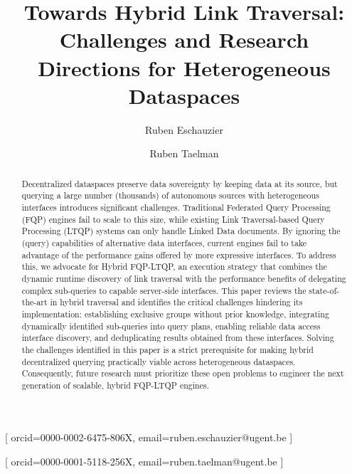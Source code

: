 \documentclass{ceurart}
\theoremstyle{definition}
\begin{document}


\title{Towards Hybrid Link Traversal: Challenges and Research Directions for Heterogeneous Dataspaces}

\author[1]{Ruben Eschauzier}[%
orcid=0000-0002-6475-806X,
email=ruben.eschauzier@ugent.be
]
\author[1]{Ruben Taelman}[%
orcid=0000-0001-5118-256X,
email=ruben.taelman@ugent.be
]

\address[1]{Department of Electronics and Information Systems, Ghent University – imec}

\begin{abstract}
Decentralized dataspaces preserve data sovereignty by keeping data at its source, 
but querying a large number (thousands) of autonomous sources with heterogeneous interfaces introduces significant challenges. 
Traditional Federated Query Processing (FQP) engines fail to scale to this size,
while existing Link Traversal-based Query Processing (LTQP) systems can only handle Linked Data documents.
By ignoring the (query) capabilities of alternative data interfaces, current engines fail 
to take advantage of the performance gains offered by more expressive interfaces.
To address this, we advocate for Hybrid FQP-LTQP, an execution strategy that combines the dynamic runtime discovery of link traversal
with the performance benefits of delegating complex sub-queries to capable server-side interfaces. 
This paper reviews the state-of-the-art in hybrid traversal and identifies the critical challenges hindering its implementation:
establishing exclusive groups without prior knowledge, integrating dynamically identified sub-queries into query plans,
enabling reliable data access interface discovery, and deduplicating results obtained from these interfaces. 
Solving the challenges identified in this paper is a strict prerequisite 
for making hybrid decentralized querying practically viable across heterogeneous dataspaces. 
Consequently, future research must prioritize these open problems to engineer the next generation of scalable, 
hybrid FQP-LTQP engines.
\end{abstract}
\end{document}
